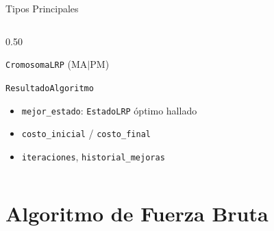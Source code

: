 \documentclass[aspectratio=169,10pt]{beamer}
\newcommand{\tc}[1]{\texttt{\small #1}}
\begin{document}
\begin{frame}{Tipos Principales}
\begin{columns}[T,onlytextwidth]
\begin{column}{0.50\textwidth}
\begin{block}{\tc{CromosomaLRP} (MA$|$PM)}
\begin{itemize}
        \end{itemize}
      \end{block}
      \begin{block}{\tc{ResultadoAlgoritmo}}
        \footnotesize
        \begin{itemize}
          \item \tc{mejor\_estado}: \tc{EstadoLRP} óptimo hallado
          \item \tc{costo\_inicial} / \tc{costo\_final}
          \item \tc{iteraciones}, \tc{historial\_mejoras}
        \end{itemize}
      \end{block}
    \end{column}
  \end{columns}
\end{frame}

\section{Algoritmo de Fuerza Bruta}
\end{document}
